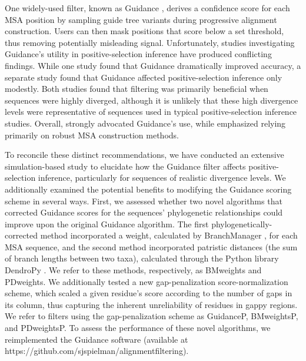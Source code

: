 \documentclass[11pt]{article}
\begin{document}
One widely-used filter, known as Guidance \citep{Penn2010}, derives a confidence score for each MSA position by sampling guide tree variants during progressive alignment construction. Users can then mask positions that score below a set threshold, thus removing potentially misleading signal. Unfortunately, studies investigating Guidance's utility in positive-selection inference have produced conflicting findings. While one study \citep{Privman2012} found that Guidance dramatically improved accuracy, a separate study \citep{Jordan2012} found that Guidance affected positive-selection inference only modestly. Both studies found that filtering was primarily beneficial when sequences were highly diverged, although it is unlikely that these high divergence levels were representative of sequences used in typical positive-selection inference studies. Overall, \citet{Privman2012} strongly advocated Guidance's use, while \citet{Jordan2012} emphasized relying primarily on robust MSA construction methods. 

To reconcile these distinct recommendations, we have conducted an extensive simulation-based study to elucidate how the Guidance filter affects positive-selection inference, particularly for sequences of realistic divergence levels. We additionally examined the potential benefits to modifying the Guidance scoring scheme in several ways.  First, we assessed whether two novel algorithms that corrected Guidance scores for the sequences' phylogenetic relationships could improve upon the original Guidance algorithm. The first phylogenetically-corrected method incorporated a weight, calculated by BranchManager \citep{Stone2007}, for each MSA sequence, and the second method incorporated patristic distances (the sum of branch lengths between two taxa), calculated through the Python library DendroPy \citep{Sukumaran2010}. We refer to these methods, respectively, as BMweights and PDweights. We additionally tested a new gap-penalization score-normalization scheme, which scaled a given residue's score according to the number of gaps in its column, thus capturing the inherent unreliability of residues in gappy regions. We refer to filters using the gap-penalization scheme as GuidanceP, BMweightsP, and PDweightsP. To assess the performance of these novel algorithms, we reimplemented the Guidance software (available at https://github.com/sjspielman/alignment\underline{\hspace*{0.2cm}}filtering). 
\end{document}
